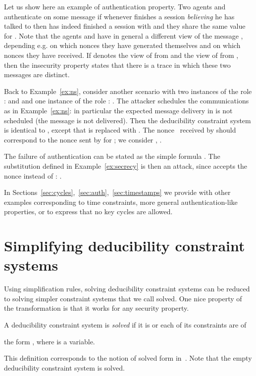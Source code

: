 \documentclass[acmtocl,acmnow]{acmtrans2m}
\newcommand{\dedsys}[1]{deducibility constraint system}
\newcommand{\dedsyss}[1]{deducibility constraint systems}
\begin{document}
\begin{example}\label{ex:auth}
Let us show here an example of authentication property.
Two agents  and  authenticate on some message  if whenever
 finishes a session \emph{believing} he has talked to  then 
has indeed finished a session with  and they share the same value
for . Note that the agents  and  have in general a different
view of the message , depending e.g. on which nonces they have generated
themselves and on which nonces they have received.
If  denotes the view of  from  and  the view of 
from , then the insecurity property states that there is a trace in which
these two messages are distinct. 


Back to Example~\ref{ex:ns}, consider another scenario with two instances
of the role :  and  and one instance of the role :
. The attacker schedules the communications as in Example~\ref{ex:ns}: in particular the expected message delivery in  is
not scheduled (the message is not delivered). Then the \dedsys{}
 is identical to , except that  is replaced with
. The nonce~ received by  should correspond to the nonce 
sent by  for ; we consider , . 


The failure of authentication can be stated as the simple formula .
The substitution  defined in Example~\ref{ex:secrecy} is then
an attack,
since  accepts the nonce  instead of : . 
\end{example}


In Sections~\ref{sec:cycles},~\ref{sec:auth},~\ref{sec:timestamps} we provide with other examples 
corresponding to time constraints, more general authentication-like
properties, or to express that no key
cycles are allowed.

\section{Simplifying \dedsyss{}}\label{sec:approach}
Using simplification rules, solving \dedsyss{} can be reduced to solving simpler
constraint systems that we call solved.
One nice property of the transformation is that it works for any
security property.

\begin{definition}
A \dedsys{} is \emph{solved} if it is
  or each of its constraints are of

the form , where  is a variable.
\end{definition}
This definition corresponds to the notion of solved form in~\cite{CS03}.
Note that the empty \dedsys{} is solved. 
\end{document}
